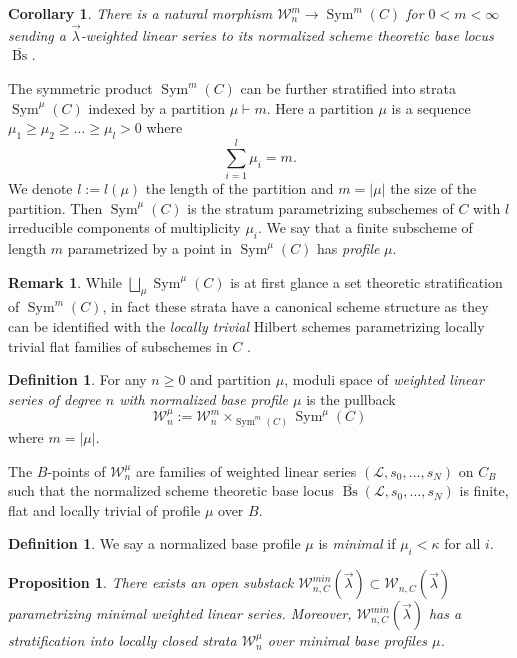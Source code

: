 \documentclass[a4paper,12pt]{amsart}
\newtheorem{cor}[thm]{Corollary}
\newtheorem{prop}[thm]{Proposition}
\theoremstyle{definition}
\newtheorem{defn}[thm]{Definition}
\newtheorem{rmk}[thm]{Remark}
\newcommand{\cL}{\mathcal{L}}
\newcommand{\cW}{\mathcal{W}}
\DeclareMathOperator{\Bs}{Bs}
\newcommand{\lambdavec}{{\vec{\lambda}}}
\DeclareMathOperator{\Sym}{Sym}
\begin{document}
	\begin{cor} There is a natural morphism $\cW_n^m \to \Sym^m(C)$ for $0 < m < \infty$ sending a $\vec{\lambda}$-weighted linear series to its normalized scheme theoretic base locus $\overline{\Bs}$. 
	\end{cor} 
	
	The symmetric product $\Sym^m(C)$ can be further stratified into strata $\Sym^\mu(C)$ indexed by a partition $\mu \vdash m$. Here a partition $\mu$ is a sequence $\mu_1 \geq \mu_2 \geq \ldots \geq \mu_l > 0$ where 
	$$
	\sum_{i = 1}^l \mu_i = m. 
	$$
	We denote $l := l(\mu)$ the length of the partition and $m = |\mu|$ the size of the partition. Then $\Sym^\mu(C)$ is the stratum parametrizing subschemes of $C$ with $l$ irreducible components of multiplicity $\mu_i$. We say that a finite subscheme of length $m$ parametrized by a point in $\Sym^\mu(C)$ has \emph{profile} $\mu$.
	
	\begin{rmk} While $\bigsqcup_\mu \Sym^\mu(C)$ is at first glance a set theoretic stratification of $\Sym^m(C)$, in fact these strata have a canonical scheme structure as they can be identified with the \emph{locally trivial} Hilbert schemes parametrizing locally trivial flat families of subschemes in $C$ \cite[Sec. 2]{grkar}. 
	\end{rmk}
	
	\begin{defn}
		For any $n \geq 0$ and partition $\mu$, moduli space of \emph{weighted linear series of degree $n$ with normalized base profile $\mu$} is the pullback 
		$$
		\cW^\mu_n := \cW_n^m \times_{\Sym^m(C)} \Sym^{\mu}(C)
		$$
		where $m = |\mu|$. 
	\end{defn}
	
	The $B$-points of $\cW^\mu_n$ are families of weighted linear series $(\cL, s_0, \ldots, s_N)$ on $C_B$ such that the normalized scheme theoretic base locus $\overline{\Bs}(\cL, s_0, \ldots, s_N)$ is finite, flat and locally trivial of profile $\mu$ over $B$.  
	
	\begin{defn} We say a normalized base profile $\mu$ is \emph{minimal} if $\mu_i < \kappa$ for all $i$. 
	\end{defn}
	
	\begin{prop}\label{prop:stack:min}
		There exists an open substack $\cW_{n,C}^{min}(\lambdavec) \subset \cW_{n,C}(\lambdavec)$ parametrizing minimal weighted linear series. Moreover, $\cW_{n,C}^{min}(\lambdavec)$ has a stratification into locally closed strata $\cW^{\mu}_n$ over  minimal base profiles $\mu$. 
	\end{prop}
	
\end{document}

